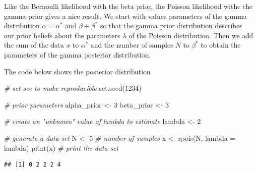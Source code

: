 \documentclass[
]{book}
\newenvironment{Shaded}{\begin{snugshade}}{\end{snugshade}}
\newcommand{\AttributeTok}[1]{\textcolor[rgb]{0.77,0.63,0.00}{#1}}
\newcommand{\CommentTok}[1]{\textcolor[rgb]{0.56,0.35,0.01}{\textit{#1}}}
\newcommand{\DecValTok}[1]{\textcolor[rgb]{0.00,0.00,0.81}{#1}}
\newcommand{\FunctionTok}[1]{\textcolor[rgb]{0.00,0.00,0.00}{#1}}
\newcommand{\NormalTok}[1]{#1}
\newcommand{\OtherTok}[1]{\textcolor[rgb]{0.56,0.35,0.01}{#1}}
\begin{document}
Like the Bernoulli likelihood with the beta prior, the Poisson
likelihood withe the gamma prior gives a nice result. We start with
values parameters of the gamma distribution \(\alpha = \alpha^*\) and
\(\beta + \beta^*\) so that the gamma prior distribution describes our
prior beliefs about the parameters \(\lambda\) of the Poisson
distribution. Then we add the sum of the data \(x\) to \(\alpha^*\) and
the number of samples \(N\) to \(\beta^*\) to obtain the parameters of
the gamma posterior distribution.

The code below shows the posterior distribution

\begin{Shaded}
\begin{Highlighting}[]
\CommentTok{\# set see to make reproducible}
\FunctionTok{set.seed}\NormalTok{(}\DecValTok{1234}\NormalTok{)}

\CommentTok{\# prior parameters}
\NormalTok{alpha\_prior }\OtherTok{\textless{}{-}} \DecValTok{3}
\NormalTok{beta\_prior }\OtherTok{\textless{}{-}} \DecValTok{3}

\CommentTok{\# create an "unknown" value of lambda to estimate}
\NormalTok{lambda }\OtherTok{\textless{}{-}} \DecValTok{2}

\CommentTok{\# generate a data set}
\NormalTok{N }\OtherTok{\textless{}{-}} \DecValTok{5}  \CommentTok{\# number of samples}
\NormalTok{x }\OtherTok{\textless{}{-}} \FunctionTok{rpois}\NormalTok{(N, }\AttributeTok{lambda =}\NormalTok{ lambda)}
\FunctionTok{print}\NormalTok{(x)  }\CommentTok{\# print the data set}
\end{Highlighting}
\end{Shaded}

\begin{verbatim}
## [1] 0 2 2 2 4
\end{verbatim}
\end{document}
